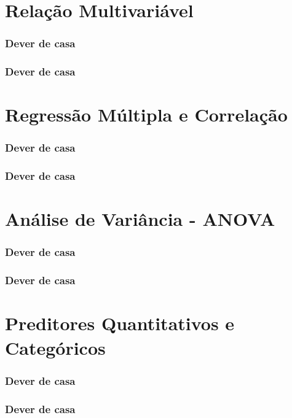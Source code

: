 \documentclass[graphics,14pt]{beamer}
\begin{document}
\section{Relação Multivariável}
\begin{frame}[t,fragile=singleslide]
\frametitle{Dever de casa}
\end{frame}
\begin{frame}[t,fragile=singleslide]
\frametitle{Dever de casa}
\end{frame}
\section{Regressão Múltipla e Correlação}
\begin{frame}[t,fragile=singleslide]
\frametitle{Dever de casa}
\end{frame}
\begin{frame}[t,fragile=singleslide]
\frametitle{Dever de casa}
\end{frame}
\section{Análise de Variância - ANOVA}
\begin{frame}[t,fragile=singleslide]
\frametitle{Dever de casa}
\end{frame}
\begin{frame}[t,fragile=singleslide]
\frametitle{Dever de casa}
\end{frame}
\section{Preditores Quantitativos e Categóricos}
\begin{frame}[t,fragile=singleslide]
\frametitle{Dever de casa}
\end{frame}
\begin{frame}[t,fragile=singleslide]
\frametitle{Dever de casa}
\end{frame}
\end{document}

